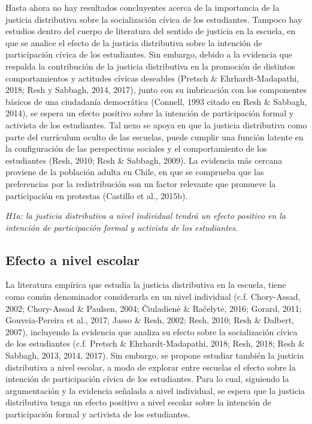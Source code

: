 \documentclass[12pt,twoside]{templates/facsothesis}
\begin{document}
Hasta ahora no hay resultados concluyentes acerca de la importancia de la justicia distributiva sobre la socialización cívica de los estudiantes. Tampoco hay estudios dentro del cuerpo de literatura del sentido de justicia en la escuela, en que se analice el efecto de la justicia distributiva sobre la intención de participación cívica de los estudiantes. Sin embargo, debido a la evidencia que respalda la contribución de la justicia distributiva en la promoción de distintos comportamientos y actitudes cívicas deseables (Pretsch \& Ehrhardt-Madapathi, 2018; Resh y Sabbagh, 2014, 2017), junto con su imbricación con los componentes básicos de una ciudadanía democrática (Connell, 1993 citado en Resh \& Sabbagh, 2014), se espera un efecto positivo sobre la intención de participación formal y activista de los estudiantes. Tal nexo se apoya en que la justicia distributiva como parte del currículum oculto de las escuelas, puede cumplir una función latente en la configuración de las perspectivas sociales y el comportamiento de los estudiantes (Resh, 2010; Resh \& Sabbagh, 2009). La evidencia más cercana proviene de la población adulta en Chile, en que se comprueba que las preferencias por la redistribución son un factor relevante que promueve la participación en protestas (Castillo et al., 2015b).

\emph{H1a: la justicia distributiva a nivel individual tendrá un efecto positivo en la intención de participación formal y activista de los estudiantes.}

\hypertarget{efecto-a-nivel-escolar}{%
\subsection{Efecto a nivel escolar}\label{efecto-a-nivel-escolar}}

La literatura empírica que estudia la justicia distributiva en la escuela, tiene como común denominador considerarla en un nivel individual (c.f. Chory-Assad, 2002; Chory-Assad \& Paulsen, 2004; Čiuladienė \& Račelytė, 2016; Gorard, 2011; Gouveia-Pereira et al., 2017; Jasso \& Resh, 2002; Resh, 2010; Resh \& Dalbert, 2007), incluyendo la evidencia que analiza su efecto sobre la socialización cívica de los estudiantes (c.f. Pretsch \& Ehrhardt-Madapathi, 2018; Resh, 2018; Resh \& Sabbagh, 2013, 2014, 2017). Sin embargo, se propone estudiar también la justicia distributiva a nivel escolar, a modo de explorar entre escuelas el efecto sobre la intención de participación cívica de los estudiantes. Para lo cual, siguiendo la argumentación y la evidencia señalada a nivel individual, se espera que la justicia distributiva tenga un efecto positivo a nivel escolar sobre la intención de participación formal y activista de los estudiantes.
\end{document}
